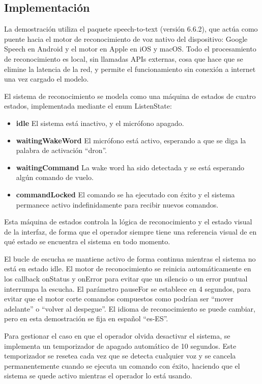 \subsection{Implementación}
La demostración utiliza el paquete speech-to-text (versión 6.6.2), que actúa como puente hacia el motor de reconocimiento de voz nativo del dispositivo: Google Speech en Android y el motor en Apple en iOS y macOS. Todo el procesamiento de reconocimiento es local, sin llamadas APIs externas, cosa que hace que se elimine la latencia de la red, y permite el funcionamiento sin conexión a internet una vez cargado el modelo.

El sistema de reconocimiento se modela como una máquina de estados de cuatro estados, implementada mediante el enum ListenState:

\begin{itemize}
    \item \textbf{idle} El sistema está inactivo, y el micrófono  apagado.
    \item \textbf{waitingWakeWord}  El micrófono está activo, esperando a que se diga la palabra de activación “dron”. 
    \item \textbf{waitingCommand}  La wake word ha sido detectada y se está esperando algún comando de vuelo.
    \item \textbf{commandLocked} El comando se ha ejecutado con éxito y el sistema permanece activo indefinidamente para recibir nuevos comandos.
\end{itemize}

Esta máquina de estados controla la lógica de reconocimiento y el estado visual de la interfaz, de forma que el operador siempre tiene una referencia visual de en qué estado se encuentra el sistema en todo momento.

El bucle de escucha se mantiene activo de forma continua mientras el sistema no está en estado idle. El motor de reconocimiento se reinicia automáticamente en los callback onStatus y onError para evitar que un silencio o un error puntual interrumpa la escucha. El parámetro pauseFor se establece en 4 segundos, para evitar que el motor corte comandos compuestos como podrían ser “mover adelante” o “volver al despegue”. El idioma de reconocimiento se puede cambiar, pero en esta demostración se fija en español “es-ES”.

Para gestionar el caso en que el operador olvida desactivar el sistema, se implementa un temporizador de apagado automático de 10 segundos. Este temporizador se resetea cada vez que se detecta cualquier voz y se cancela permanentemente cuando se ejecuta un comando con éxito, haciendo que el sistema se quede activo mientras el operador lo está usando.


